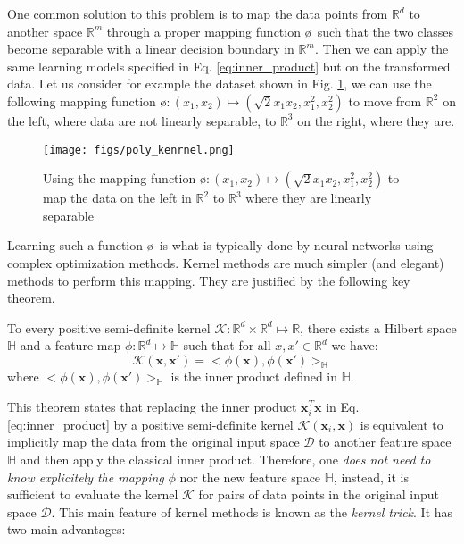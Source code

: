 One common solution to this problem is to map the data points from $\mathbb{R}^d$ to another space $\mathbb{R}^m$  through a proper mapping function \o~such   that the two classes become separable with a linear decision boundary in $\mathbb{R}^m$. Then we can apply the same learning models specified in Eq. \ref{eq:inner_product} but on the transformed data. Let us consider for example the dataset shown in Fig. \ref{fig:polynomial_kernel},  we can use the following mapping function \o$:(x_1,x_2)\mapsto (\sqrt{2}x_1x_2,x_1^2,x_2^2)$ to move from $\mathbb{R}^2$ on the left, where data are not linearly separable, to $\mathbb{R}^3$ on the right, where they are.
\begin{figure}[H]
\centering
\texttt{[image: figs/poly\_kenrnel.png]}
\caption[Lifting data to a higher-dimension space to get linearly separable classes]{ Using the mapping function \o$:(x_1,x_2)\mapsto (\sqrt{2}x_1x_2,x_1^2,x_2^2)$ to map the data on the left in $\mathbb{R}^2$ to $\mathbb{R}^3$ where they are linearly separable}
\label{fig:polynomial_kernel}
\end{figure}
Learning such a function \o~is what is typically done by neural networks using complex optimization methods.  Kernel methods are much simpler (and elegant) methods to perform this mapping. They are justified by the following key theorem.
\begin{theorem}
To every positive semi-definite kernel $\mathcal{K}:\mathbb{R}^d\times \mathbb{R}^d\mapsto \mathbb{R}$, there exists a Hilbert space $\mathbb{H}$ and a feature map $\phi:\mathbb{R}^d\mapsto\mathbb{H}$ such that for all $x,x'\in\mathbb{R}^d$ we have: 
\begin{equation}
\label{eq:kernel_main_equation}
    \mathcal{K}(\mathbf{x},\mathbf{x}')=<\phi(\mathbf{x}),\phi(\mathbf{x}')>_\mathbb{H}
\end{equation}
where $<\phi(\mathbf{x}),\phi(\mathbf{x}')>_\mathbb{H}$ is the inner product defined in $\mathbb{H}$.
\end{theorem}
This theorem states that replacing the inner product $\mathbf{x}_i^T\mathbf{x}$ in Eq. \ref{eq:inner_product} by a positive semi-definite kernel $\mathcal{K}(\mathbf{x}_i,\mathbf{x})$ is equivalent to implicitly map the data from the original input space $\mathcal{D}$ to another feature space $\mathbb{H}$ and then apply the classical inner product. Therefore, one \emph{does not need to know explicitely the mapping} $\phi$ nor the new feature space $\mathbb{H}$, instead, it is sufficient to evaluate the kernel $\mathcal{K}$ for pairs of data points in the original input space $\mathcal{D}$. This main feature of kernel methods is known as the \emph{kernel trick}. It has two main advantages:
